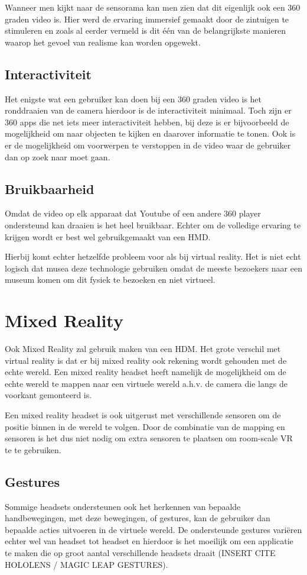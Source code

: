 Wanneer men kijkt naar de sensorama kan men zien dat dit eigenlijk ook een 360 graden video is. Hier werd de ervaring immersief gemaakt door de zintuigen te stimuleren en zoals al eerder vermeld is dit één van de belangrijkste manieren waarop het gevoel van realisme kan worden opgewekt.

\subsection{Interactiviteit}
Het enigste wat een gebruiker kan doen bij een 360 graden video is het ronddraaien van de camera hierdoor is de interactiviteit minimaal. Toch zijn er 360 apps die net iets meer interactiviteit hebben, bij deze is er bijvoorbeeld de mogelijkheid om naar objecten te kijken en daarover informatie te tonen. Ook is er de mogelijkheid om voorwerpen te verstoppen in de video waar de gebruiker dan op zoek naar moet gaan.
\subsection{Bruikbaarheid}
Omdat de video op elk apparaat dat Youtube of een andere 360 player ondersteund kan draaien is het heel bruikbaar. Echter om de volledige ervaring te krijgen wordt er best wel gebruikgemaakt van een HMD.

Hierbij komt echter hetzelfde probleem voor als bij virtual reality. Het is niet echt logisch dat musea deze technologie gebruiken omdat de meeste bezoekers naar een museum komen om dit fysiek te bezoeken en niet virtueel.

\section{Mixed Reality} \label{sec:mixedreality}
Ook Mixed Reality zal gebruik maken van een HDM. Het grote verschil met virtual reality is dat er bij mixed reality ook rekening wordt gehouden met de echte wereld. Een mixed reality headset heeft namelijk de mogelijkheid om de echte wereld te mappen naar een virtuele wereld a.h.v. de camera die langs de voorkant gemonteerd is.

Een mixed reality headset is ook uitgerust met verschillende sensoren om de positie binnen in de wereld te volgen. Door de combinatie van de mapping en sensoren is het dus niet nodig om extra sensoren te plaatsen om room-scale VR te te gebruiken.

\subsection{Gestures}
Sommige headsets ondersteunen ook het herkennen van bepaalde handbewegingen, met deze bewegingen, of gestures, kan de gebruiker dan bepaalde acties uitvoeren in de virtuele wereld. De ondersteunde gestures variëren echter wel van headset tot headset en hierdoor is het moeilijk om een applicatie te maken die op groot aantal verschillende headsets draait (INSERT CITE HOLOLENS / MAGIC LEAP GESTURES).


